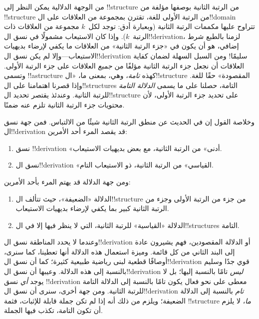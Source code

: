 \documentclass[../../../include/open-logic-section]{subfiles}
\begin{document}
من الوجهة الدلالية يمكن النظر إلى !!{structure} من الرتبة الثانية
بوصفها مؤلفة من !!{structure} من الرتبة الأولى للغة، تقترن بمجموعة من
العلاقات على ال!!{domain} تتراوح عليها مكممات الرتبة الثانية (وبعبارة
أدق: توجد لكل~$k$ مجموعة من العلاقات ذات الرتبة~$k$). وإذا كان
الاستيعاب مشمولًا في نسق ال!!{derivation}، لزمنا بالطبع شرط إضافي، هو
أن يكون في «جزء الرتبة الثانية» من العلاقات ما يكفي لإرضاء بديهيات
الاستيعاب---وإلا لم يكن نسق ال!!{derivation} سليمًا!{} ومن السبل السهلة
لضمان كفاية العلاقات أن نجعل جزء الرتبة الثانية مؤلفًا من
\emph{جميع} العلاقات على جزء الرتبة الأولى. وتسمى !!a{structure} كهذه
\emph{تامة}، وهي، بمعنى ما، «ال!!{structure} المقصودة» حقًا للغة.
وإذا قصرنا اهتمامنا على ال!!{structure}s التامة، حصلنا على ما يسمى
\emph{الدلالة التامة} للرتبة الثانية. وعندئذ يقتصر تحديد
ال!!{structure} على تحديد جزء الرتبة الأولى، لأن محتويات جزء الرتبة
الثانية تلزم عنه ضمنًا.

وخلاصة القول إن في الحديث عن منطق الرتبة الثانية شيئًا من الالتباس.
فمن جهة نسق ال!!{derivation} قد يقصد المرء أحد الأمرين:
\begin{enumerate}
\item نسق !!{derivation} «أدنى» من الرتبة الثانية، مع بعض بديهيات
  الاستيعاب.
\item نسق ال!!{derivation} «القياسي» من الرتبة الثانية، ذو الاستيعاب
  التام.
\end{enumerate}
ومن جهة الدلالة قد يهتم المرء بأحد الأمرين:
\begin{enumerate}
\item الدلالة «الضعيفة»، حيث تتألف ال!!{structure} من جزء من الرتبة
  الأولى وجزء من الرتبة الثانية كبير بما يكفي لإرضاء بديهيات
  الاستيعاب.
\item الدلالة «القياسية» للرتبة الثانية، التي لا ينظر فيها إلا في
  ال!!{structure}s التامة.
\end{enumerate}
وعندما لا يحدد المناطقة نسق ال!!{derivation} أو الدلالة المقصودين، فهم
يشيرون عادة إلى البند الثاني من كل قائمة. وميزة استعمال هذه الدلالة
أنها تعطينا، كما سنرى، أوصافًا قطعية لبنى رياضية طبيعية كثيرة؛ كما أن
نسق ال!!{derivation} قوي جدًا وسليم بالنسبة إلى هذه الدلالة. وعيبها أن
نسق ال!!{derivation} \emph{ليس} تامًا بالنسبة إليها؛ بل لا يوجد
\emph{أي} نسق !!{derivation} معطى على نحو فعال يكون تامًا بالنسبة إلى
الدلالة التامة للرتبة الثانية. ومن جهة أخرى، سنرى أن نسق
ال!!{derivation} \emph{تام} بالنسبة إلى الدلالة الضعيفة؛ ويلزم من ذلك
أنه إذا لم تكن جملة قابلة للإثبات، فثمة !!{structure} \emph{ما}، لا
يلزم أن تكون التامة، تكذب فيها الجملة.
\end{document}
